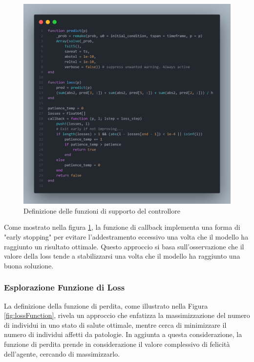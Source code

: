 \begin{figure}[H]
    \begin{center}
		\includegraphics[width=\textwidth]{img/controller2.png}
		\caption{Definizione delle funzioni di supporto del controllore}
		\label{fig:controller2}
	\end{center}
\end{figure}

Come mostrato nella figura \ref{fig:controller2}, la funzione di 
callback implementa una forma di "early stopping" per evitare 
l'addestramento eccessivo una volta che il modello ha raggiunto un 
risultato ottimale. Questo approccio si basa sull'osservazione che 
il valore della loss tende a stabilizzarsi una volta che il modello 
ha raggiunto una buona soluzione.

\newpage

\subsubsection{Esplorazione Funzione di Loss}

La definizione della funzione di perdita, come illustrato nella Figura 
\ref{fig:lossFunction}, rivela un approccio che enfatizza la 
massimizzazione del numero di individui in uno stato di salute ottimale, 
mentre cerca di minimizzare il numero di individui affetti da patologie. 
In aggiunta a questa considerazione, la funzione di perdita prende in 
considerazione il valore complessivo di felicità dell'agente, cercando di 
massimizzarlo. 


